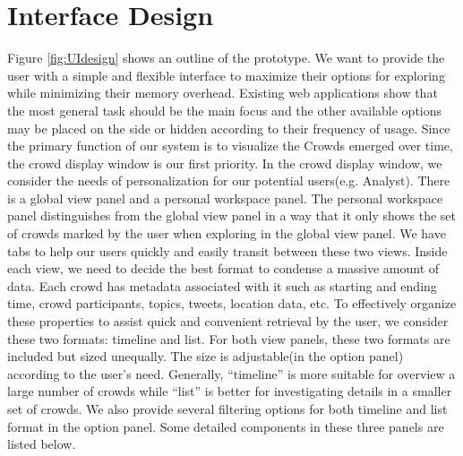 \documentclass{sig-alternate}
\begin{document}
\section{Interface Design}

Figure \ref{fig:UIdesign} shows an outline of the prototype. We want to provide
the user with a simple and flexible interface to maximize their options for
exploring while minimizing their memory overhead. Existing web applications
show that the most general task should be the main focus and the other
available options may be placed on the side or hidden according to their
frequency of usage. Since the primary function of our system is to visualize
the Crowds emerged over time, the crowd display window is our
first priority. In the crowd display window, we
consider the needs of personalization for our potential users(e.g. Analyst).
There is a global view panel and a personal workspace panel. The personal
workspace panel distinguishes from the global view panel in a way that it only
shows the set of crowds marked by the user when exploring in the global view
panel. We have tabs to help our users quickly and easily transit between these
two views. Inside each view, we need to decide the best format to condense
a massive amount of data. Each crowd has metadata associated with it such as
starting and ending time, crowd participants, topics, tweets,
location data, etc. To effectively organize these properties to assist quick
and convenient retrieval by the user, we consider these two formats: timeline
and list. For both view panels, these two formats are included but sized
unequally. The size is adjustable(in the option panel) according to the user's
need. Generally, ``timeline'' is more suitable for overview a large number of
crowds while ``list'' is better for investigating details in a smaller set of crowds. We
also provide several filtering options for both timeline and list format in the
option panel. Some detailed components in these three panels are listed below.
\end{document}
